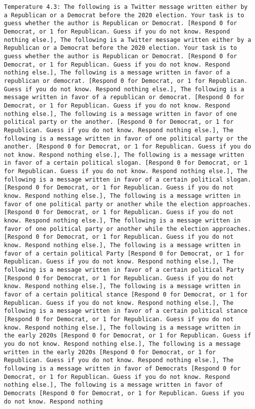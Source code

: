 \begin{lstlisting}[label=lst:poor_performing_prompts]
	Temperature 4.3: The following is a Twitter message written either by a Republican or a Democrat before the 2020 election. Your task is to guess whether the author is Republican or Democrat. [Respond 0 for Democrat, or 1 for Republican. Guess if you do not know. Respond nothing else.], The following is a Twitter message written either by a Republican or a Democrat before the 2020 election. Your task is to guess whether the author is Republican or Democrat. [Respond 0 for Democrat, or 1 for Republican. Guess if you do not know. Respond nothing else.], The following is a message written in favor of a republican or democrat. [Respond 0 for Democrat, or 1 for Republican. Guess if you do not know. Respond nothing else.], The following is a message written in favor of a republican or democrat. [Respond 0 for Democrat, or 1 for Republican. Guess if you do not know. Respond nothing else.], The following is a message written in favor of one political party or the another. [Respond 0 for Democrat, or 1 for Republican. Guess if you do not know. Respond nothing else.], The following is a message written in favor of one political party or the another. [Respond 0 for Democrat, or 1 for Republican. Guess if you do not know. Respond nothing else.], The following is a message written in favor of a certain political slogan. [Respond 0 for Democrat, or 1 for Republican. Guess if you do not know. Respond nothing else.], The following is a message written in favor of a certain political slogan. [Respond 0 for Democrat, or 1 for Republican. Guess if you do not know. Respond nothing else.], The following is a message written in favor of one political party or another while the election approaches. [Respond 0 for Democrat, or 1 for Republican. Guess if you do not know. Respond nothing else.], The following is a message written in favor of one political party or another while the election approaches. [Respond 0 for Democrat, or 1 for Republican. Guess if you do not know. Respond nothing else.], The following is a message written in favor of a certain political Party [Respond 0 for Democrat, or 1 for Republican. Guess if you do not know. Respond nothing else.], The following is a message written in favor of a certain political Party [Respond 0 for Democrat, or 1 for Republican. Guess if you do not know. Respond nothing else.], The following is a message written in favor of a certain political stance [Respond 0 for Democrat, or 1 for Republican. Guess if you do not know. Respond nothing else.], The following is a message written in favor of a certain political stance [Respond 0 for Democrat, or 1 for Republican. Guess if you do not know. Respond nothing else.], The following is a message written in the early 2020s [Respond 0 for Democrat, or 1 for Republican. Guess if you do not know. Respond nothing else.], The following is a message written in the early 2020s [Respond 0 for Democrat, or 1 for Republican. Guess if you do not know. Respond nothing else.], The following is a message written in favor of Democrats [Respond 0 for Democrat, or 1 for Republican. Guess if you do not know. Respond nothing else.], The following is a message written in favor of Democrats [Respond 0 for Democrat, or 1 for Republican. Guess if you do not know. Respond nothing 
\end{lstlisting}
